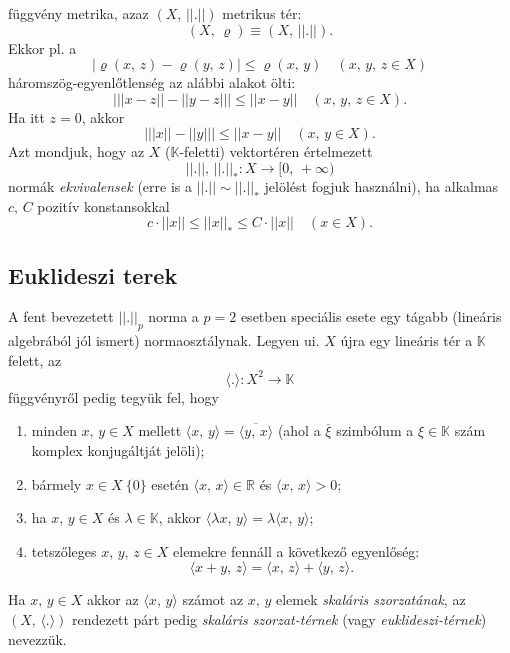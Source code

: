 \documentclass[12pt]{article}
\newcommand{\R}{\mathbb{R}}
\newcommand{\K}{\mathbb{K}}
\begin{document}
    függvény metrika, azaz $(X, \, ||.||)$ metrikus tér:
    \[
        (X, \, \varrho) \equiv (X, \, ||.||).
    \]
    Ekkor pl. a
    \[
        |\varrho(x, \, z) - \varrho(y, \, z)| \leq \varrho(x, \, y) \quad (x, \, y, \, z \in X) 
    \]
    háromszög-egyenlőtlenség az alábbi alakot ölti:
    \[
        \big| ||x-z|| - ||y-z|| \big| \leq ||x-y|| \quad (x, \, y, \, z \in X).
    \]
    Ha itt $z = 0$, akkor
    \[
        \big| ||x|| - ||y|| \big| \leq ||x-y|| \quad (x, \, y \in X).
    \]
    Azt mondjuk, hogy az $X$ ($\K$-feletti) vektortéren értelmezett
    \[
        ||.||, \, ||.||_* : X \to [0, \, + \infty)
    \]
    normák \textit{ekvivalensek} (erre is a $||.|| \sim ||.||_*$ jelölést fogjuk használni), ha alkalmas $c, \, C$ pozitív konstansokkal
    \[
        c \cdot ||x|| \leq ||x||_* \leq C \cdot ||x|| \quad (x \in X).
    \]
    
    \subsection{Euklideszi terek}
    A fent bevezetett $||.||_p$ norma a $p=2$ esetben speciális esete egy tágabb (lineáris algebrából jól ismert) normaosztálynak. Legyen ui. $X$ újra egy lineáris tér a $\K$ felett, az
    \[
        \langle . \rangle : X^2 \to \K
    \]
    függvényről pedig tegyük fel, hogy
    \begin{enumerate}
        \item minden $x, \, y \in X$ mellett $\langle x, \, y \rangle = \overline{\langle y, \, x \rangle}$ (ahol a $\overline{\xi}$ szimbólum a $\xi \in \K$ szám komplex konjugáltját jelöli);
        \item bármely $x \in X \ \{0\}$ esetén $\langle x, \, x \rangle \in \R$ és $\langle x, \, x \rangle > 0;$
        \item ha $x, \, y \in X$ és $\lambda \in \K$, akkor $\langle \lambda x, \, y \rangle = \lambda \langle x, \, y \rangle$;
        \item tetszőleges $x, \, y, \, z \in X$ elemekre fennáll a következő egyenlőség:
        \[
            \langle x + y, \, z \rangle = \langle x, \, z \rangle + \langle y, \, z \rangle.
        \]
    \end{enumerate}
    Ha $x, \, y \in X$ akkor az $\langle x, \, y \rangle$ számot az $x, \, y$ elemek \textit{skaláris szorzatának}, az $(X, \, \langle . \rangle)$ rendezett párt pedig \textit{skaláris szorzat-térnek} (vagy \textit{euklideszi-térnek}) nevezzük.\\
\end{document}

